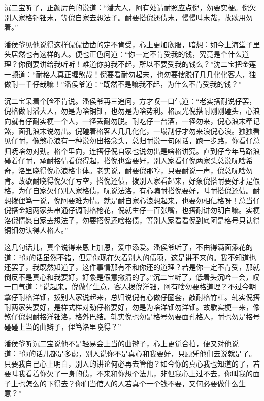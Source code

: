 \documentclass[12pt,UTF8]{ctexbook}
\begin{document}
{{{沉二宝听了，正颜厉色的说道：“潘大人，阿有处请耐照应点倪，勿要实梗。倪欠别人家格铜钿末，等倪自家去想法子。耐要搭倪还债末，慢慢叫末哉，故歇用勿着。”

潘侯爷见他说得这样侃侃凿凿的定不肯受，心上更加欣服，暗想：如今上海堂子里头居然也有这样的人。便也正色问道：“你一定不肯受我的钱，究竟是个什么道理？你倒要讲给我听听！难道你剪我不起，所以不要受我的钱么？”沈二宝把金莲一顿道：“耐格人真正缠煞哉！倪要看耐勿起末，也勿要搳脱仔几几化化客人，独做耐一千仔哉嘛！”潘侯爷道：“既然不是嘛我不起，为什么不肯受我的钱？”

沉二宝呆着个脸不肯说。潘侯爷再三追问，方才叹一口气道：“老实搭耐说仔罢，倪格做耐潘大人，勿是为啥铜钿，也勿是为啥势利。格辰光倪搭耐刚刚碰头，心浪向就有仔耐实梗一个人，一径丢耐勿脱。耐吃仔一台酒，一径勿来，倪心浪末牵记煞，面孔浪末说勿出。倪碰着格客人几几化化，一塌刮仔才勿来浪倪心浪。独独看见仔耐，像煞心浪有一种说勿出格念头，总归耐说一句闲话，跑一步路，你看仔总归呒啥勿对劲。格个里向，连搭仔倪自家也说勿出是啥格讲究。直到仔今年马路浪碰着仔耐，承耐格情看倪得起，搭倪也蛮要好，别人家看仔倪两家头总说呒啥希奇，洛里晓得倪心浪格事体。老实说，耐要倪那哼，只要耐说一声，倪总呒啥勿肯。故歇耐晓得倪欠仔亏空，搭倪还债，拨别人家看起来，好象倪搭耐要好才是假格，为仔自家欠仔别人家格债，呒说法洛，有心骗耐搭倪要好，叫耐搭倪还债。耐想拨俚笃一说，倪阿要难为情。就是耐自家心浪想起来，也要勿相信格呀！总当仔倪搭金姐两家头串通仔调耐格枪花，倪就生仔一百张嘴，也搭耐讲勿明白嘛。实梗洛倪情愿自家去想法子，勿要搭倪还啥格债，等别人家看看倪到底阿是格号只认得铜钿勿认得人格人。”

这几句话儿，真个说得来恩上加恩，爱中添爱。潘侯爷听了，不由得满面添花的道：“你的话虽然不错，但是你现在欠着别人的债项，这是讲不来的。我不知道也还罢了，我既然知道了，这件事情那有不和你还的道理？若是你一定不肯受，那就倒反不是真心和我要好，好象是假意撇清的了。”沉二宝听了，低着头沉吟一会，叹一口气道：“说起来，倪做仔生意，客人拨倪洋钿，阿有啥勿要格道理？不过今朝拿仔耐格洋钿，拨别人家说起来，总归说倪有心做仔圈套，敲耐格竹杠。轧实倪搭耐两家头要好，是样式样对劲仔格要好，勿是为啥洋钿勿洋钿。故歇实梗一来，像煞仔倪想耐格洋钿洛，格外巴结。轧实倪也勿是格号勿要面孔格人，耐也勿是格号碰碰上当的曲辫子，俚笃洛里晓得？”

潘侯爷听沉二宝说他不是轻易会上当的曲辫子，心上更觉合拍，便又对他说道：“你的话儿都是多虑，别人说你不是真心和我要好，只顾凭他们去说就是了。只要我自己心上明白，别人的讲论何必再去管他？如今你的真心我也知道的了，若要叫我看着你欠了一身的债，不来和你想个法儿，非但我心上过不去，你叫我的面子上也怎么的下得去？你们当倌人的人若真个一个钱不要，又何必要做什么生意？”

}}}
\end{document}
